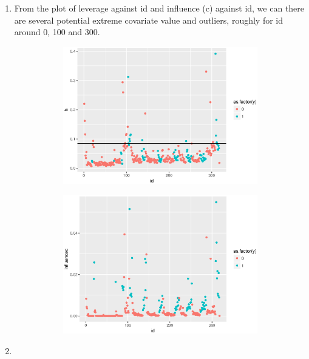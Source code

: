 \documentclass{article}
\begin{document}
\begin{enumerate}[leftmargin = 0 em, label = \arabic*., font = \bfseries]
\begin{enumerate}
\newpage
		\item 
		From the plot of leverage against id and influence (c) against id, we can there are several potential extreme covariate value and outliers, roughly for id around 0, 100 and 300.
		\begin{figure}[!htb]
		    \centering
			\begin{subfigure}[b]{0.5\textwidth}
			\includegraphics[width = \textwidth]{leverage.eps}
			\end{subfigure}%
			\begin{subfigure}[b]{0.5\textwidth}
			\includegraphics[width = \textwidth]{influence.eps}
			\end{subfigure}
		\end{figure}

		\item 


\end{enumerate}
\end{enumerate}
\end{document}
